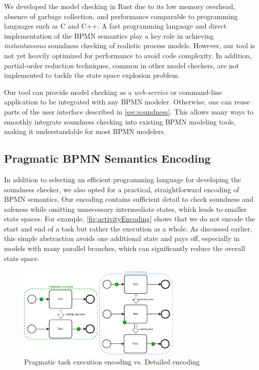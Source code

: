 \documentclass[runningheads]{llncs}
\begin{document}
We developed the model checking in Rust due to its low memory overhead, absence of garbage collection, and performance comparable to programming languages such as C and C++.
A fast programming language and direct implementation of the BPMN semantics play a key role in achieving \textit{instantaneous} soundness checking of realistic process models.
However, our tool is not yet heavily optimized for performance to avoid code complexity.
In addition, partial-order reduction techniques, common in other model checkers, are not implemented to tackle the state space explosion problem.

Our tool can provide model checking as a \textit{web-service} or command-line application to be integrated with any BPMN modeler.
Otherwise, one can reuse parts of the user interface described in \autoref{sec:soundness}.
This allows many ways to smoothly integrate soundness checking into existing BPMN modeling tools, making it understandable for most BPMN modelers.

\subsection{Pragmatic BPMN Semantics Encoding}
In addition to selecting an efficient programming language for developing the soundness checker, we also opted for a practical, straightforward encoding of BPMN semantics.
Our encoding contains sufficient detail to check soundness and safeness while omitting unnecessary intermediate states, which leads to smaller state spaces.
For example, \autoref{fig:activityEncoding} shows that we do not encode the start and end of a task but rather the execution as a whole.
As discussed earlier, this simple abstraction avoids one additional state and pays off, especially in models with many parallel branches, which can significantly reduce the overall state space.

\begin{figure}[ht]
	\centering
	\includegraphics[width=0.7\textwidth]{images/pragmatic-encoding}
	\caption{Pragmatic task execution encoding vs. Detailed encoding}
	\label{fig:activityEncoding}
\end{figure}
\end{document}
